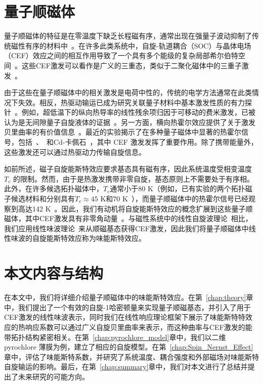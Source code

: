 \section{量子顺磁体}
量子顺磁体的特征是在零温度下缺乏长程磁有序，通常出现在强量子波动抑制了传统磁性有序的材料中~\cite{knolle2019Field}。在许多此类系统中，自旋-轨道耦合（SOC）与晶体电场（CEF）效应之间的相互作用导致了一个具有多个能级的复杂局部希尔伯特空间~\cite{rau2016SpinOrbit}。这些CEF激发可以看作是广义的三重态，类似于二聚化磁体中的三重子激发~\cite{akbari2023Topological, mcclarty2017Topological, romhanyi2015Hall}。

由于这些在量子顺磁体中的相关激发是电荷中性的，传统的电学方法通常在此类情况下失效。相反，热驱动输运已成为研究关联量子材料中基本激发性质的有力探针~\cite{zhang2024Thermal, onose2010Observation, katsura2010theory}。例如，超低温下的纵向热导率的线性残余项归因于可移动的费米激发，已被认为是无间隙量子自旋液体的证据~\cite{ni2019Absence, bourgeois-hope2019Thermal, zhu2023Fluctuating}。另一方面，横向热霍尔效应提供了关于激发贝里曲率的有价值信息~\cite{zhang2024Thermal, ma2024upper, boulanger2020Thermal}。最近的实验揭示了在多种量子磁体中显著的热霍尔信号，包括~\cite{li2013Phononglasslike}、~\cite{tokiwa2016Possible}和Cd-卡佩石~\cite{akazawa2020Thermal}，其中 CEF 激发发挥了重要作用。除了携带能量外，这些激发还可以通过热驱动力传输自旋信息。

如前所述，磁子自旋能斯特效应要求基态具有磁有序，因此系统温度受相变温度 $T_c$ 的限制。然而，由于是热激发携带非零自旋，基态原则上不需要处于有序相。此外，在许多候选拓扑磁体中，$T_c$通常小于80 K（例如，已有实验的两个拓扑磁子候选材料和分别具有$T_c\approx 45$ K和$70$ K~\cite{huang2017Layerdependent, onose2010Observation}），而量子顺磁体中的热霍尔信号已经观察到高达142 K~\cite{hirschberger2015Thermal}。因此，我们有动机将自旋能斯特效应的概念扩展到这些量子顺磁体，其中CEF激发具有非零角动量~\cite{babkevich2015Neutrona, thalmeier2024Induced}。与磁性系统中的线性自旋波理论~\cite{kittel2018introduction}相比，我们应用线性味波理论~\cite{joshi1999elementary, li19984}来从顺磁基态获得CEF激发，因此我们将量子顺磁体中线性味波的自旋能斯特效应称为味能斯特效应。

\section{本文内容与结构}
在本文中，我们将详细介绍量子顺磁体中的味能斯特效应。在第~\ref{chap:theory}章中，我们提出了一个有效的自旋-1哈密顿量来实现量子顺磁基态，并引入了用于CEF激发的线性味波表示，同时我们在线性响应理论框架下展示了味能斯特特效应的热响应系数可以通过广义自旋贝里曲率来表示，而这种曲率与CEF激发的能带拓扑结构紧密相关。在第~\ref{chap:pyrochlore_model}章中，我们以二维 pyrochlore 薄膜为例，建立了相应的自旋模型。在第~\ref{chap:Spin_Nernst_Effect}章中，评估了味能斯特系数，并研究了系统温度、耦合强度和外部磁场对味能斯特自旋输运的影响。最后，在第~\ref{chap:summary}章中，我们对本文进行了总结并提出了未来研究的可能方向。


